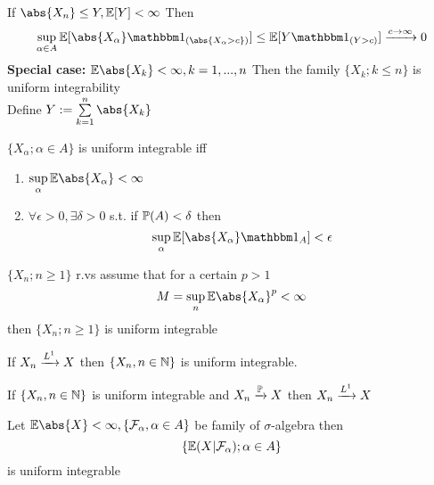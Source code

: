 \begin{example}
If $\abs{X_n} \leq Y, \E[Y] < \infty$ Then
\begin{equation*}
    \sup\limits_{\alpha\in A}\E[\abs{X_\alpha} \I_{(\abs{X_\alpha > c})}] \leq  \E[Y \I_{(Y > c)}] \xrightarrow{c\rightarrow \infty} 0
\end{equation*}
\textbf{Special case:} $\E\abs{X_k} < \infty, k = 1,...,n$ Then the family $\{X_k; k\leq n\}$ is uniform integrability \\
\pf Define $Y:= \bigs{k=1}^n \abs{X_k}$
\end{example}
\vspace{1cm}
\begin{prop} $\{X_\alpha; \alpha\in A\}$ is uniform integrable iff
\begin{enumerate}
    \item $\supunder{\alpha} \E\abs{X_\alpha} < \infty$
    \item $\forall \epsilon >0,\exists \delta>0 $ s.t. if $\mathbb{P}(A)<\delta $ then \begin{equation*}
        \supunder{\alpha} \E[\abs{X_\alpha}\I_A] < \epsilon
    \end{equation*}
\end{enumerate}
\end{prop}
\begin{cor}
    $\{X_n; n\geq1 \}$ r.vs assume that for a certain $p >1$\begin{equation*}
        M = \supunder{n} \E\abs{X_\alpha}^p < \infty
    \end{equation*} then $\{X_n; n\geq1 \}$ is uniform integrable
\end{cor}

\newpage
\pf
\newpage
\begin{thm}
If $X_n \xrightarrow{L^{1}} X$ then $\{X_n, n\in \mathbb{N} \}$ is uniform integrable.
\end{thm}
\vspace{12cm}
\begin{thm}
If $\{X_n, n\in \mathbb{N} \}$ is uniform integrable and $X_n \xrightarrow{\mathbb{P}} X$ then $X_n \xrightarrow{L^{1}} X$
\end{thm}\pf

\newpage
\begin{lem}
    Let $\E\abs{X} < \infty, \{\F_\alpha, \alpha\in A\}$ be family of $\sigma$-algebra then \begin{equation*}
        \{\mathbb{E}(X|\mathcal{F}_\alpha); \alpha\in A\}
    \end{equation*} is uniform integrable
\end{lem}

